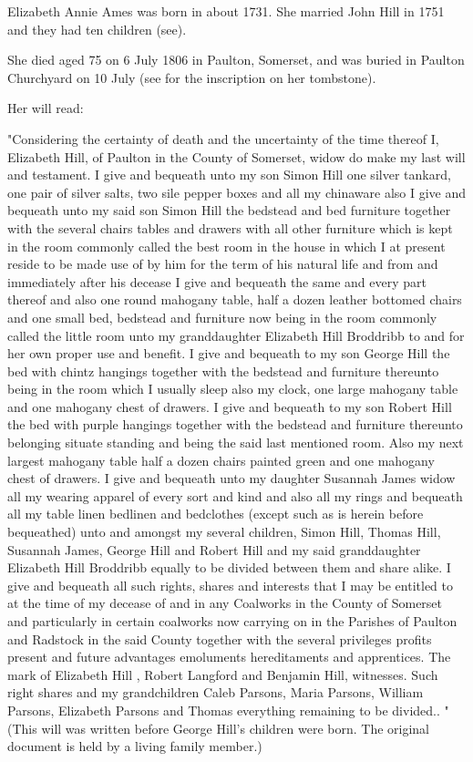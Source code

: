 
Elizabeth Annie Ames was born in about 1731.  She married John Hill in 1751 and they had ten children (see).

She died aged 75 on 6 July 1806 in Paulton, Somerset, and was buried in Paulton Churchyard on 10 July (see for the inscription on her tombstone).

Her will read:

 "Considering the certainty of death and the uncertainty of the time thereof I, Elizabeth Hill, of Paulton in the County of Somerset, widow do make my last will and testament. I give and bequeath unto my son Simon Hill one silver tankard, one pair of silver salts, two sile pepper boxes and all my chinaware also I give and bequeath unto my said son Simon Hill the bedstead and bed furniture together with the several chairs tables and drawers with all other furniture which is kept in the room commonly called the best room in the house in which I at present reside to be made use of by him for the term of his natural life and from and immediately after his decease I give and bequeath the same and every part thereof and also one round mahogany table, half a dozen leather bottomed chairs and one small bed, bedstead and furniture now being in the room commonly called the little room unto my granddaughter Elizabeth Hill Broddribb to and for her own proper use and benefit. I give and bequeath to my son George Hill the bed with chintz hangings together with the bedstead and furniture thereunto being in the room which I usually sleep also my clock, one large mahogany table and one mahogany chest of drawers. I give and bequeath to my son Robert Hill the bed with purple hangings together with the bedstead and furniture thereunto belonging situate standing and being the said last mentioned room. Also my next largest mahogany table half a dozen chairs painted green and one mahogany chest of drawers. I give and bequeath unto my daughter Susannah James widow all my wearing apparel of every sort and kind and also all my rings and bequeath all my table linen bedlinen and bedclothes (except such as is herein before bequeathed) unto and amongst my several children, Simon Hill, Thomas Hill, Susannah James, George Hill and Robert Hill and my said granddaughter Elizabeth Hill Broddribb equally to be divided between them and share alike. I give and bequeath all such rights, shares and interests that I may be entitled to at the time of my decease of and in any Coalworks in the County of Somerset and particularly in certain coalworks now carrying on in the Parishes of Paulton and Radstock in the said County together with the several privileges profits present and future advantages emoluments hereditaments and apprentices. The mark of Elizabeth Hill , Robert Langford and Benjamin Hill, witnesses. Such right shares and my grandchildren Caleb Parsons, Maria Parsons, William Parsons, Elizabeth Parsons and Thomas everything remaining to be divided.. "  (This will was written before George Hill's children were born. The original document is held by a living family member.)

